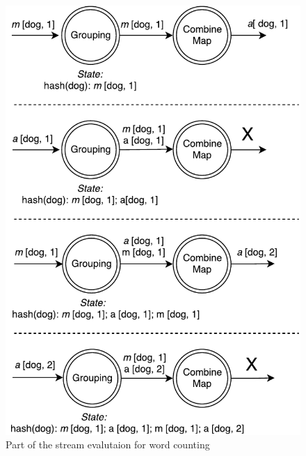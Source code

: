 \begin{figure}[htb]
  \centering
  \includegraphics[scale=0.5]{pics/wordcount}
  \caption{Part of the stream evalutaion for word counting}
  \label {word-count-figure}
\end{figure}
